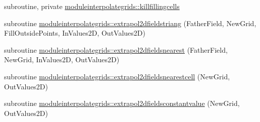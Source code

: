 \begin{DoxyCompactItemize}
\item 
subroutine, private \mbox{\hyperlink{namespacemoduleinterpolategrids_ab2c9728a897c55e3db86eb34edf09800}{moduleinterpolategrids\+::killfillingcells}}
\item 
subroutine \mbox{\hyperlink{namespacemoduleinterpolategrids_a20223d63f36c638cc63f14868772d148}{moduleinterpolategrids\+::extrapol2dfieldstriang}} (Father\+Field, New\+Grid, Fill\+Outside\+Points, In\+Values2D, Out\+Values2D)
\item 
subroutine \mbox{\hyperlink{namespacemoduleinterpolategrids_a6f499d806252d62f33788a8d02639319}{moduleinterpolategrids\+::extrapol2dfieldsnearest}} (Father\+Field, New\+Grid, In\+Values2D, Out\+Values2D)
\item 
subroutine \mbox{\hyperlink{namespacemoduleinterpolategrids_a8b539cd3b43a2490e5eb54aee6abf1d0}{moduleinterpolategrids\+::extrapol2dfieldsnearestcell}} (New\+Grid, Out\+Values2D)
\item 
subroutine \mbox{\hyperlink{namespacemoduleinterpolategrids_a57274a0561d59adfc89dec77051df3e4}{moduleinterpolategrids\+::extrapol2dfieldsconstantvalue}} (New\+Grid, Out\+Values2D)
\end{DoxyCompactItemize}
